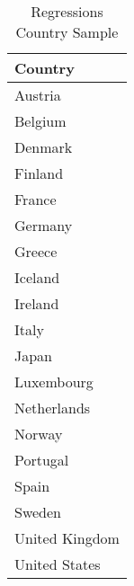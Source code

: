 \begin{table}[ht]
\centering
\caption{Regressions Country Sample} 
\label{country_sample}
{\footnotesize
\begin{tabular}{l}
  \hline
Country \\ 
  \hline
Austria \\ 
  Belgium \\ 
  Denmark \\ 
  Finland \\ 
  France \\ 
  Germany \\ 
  Greece \\ 
  Iceland \\ 
  Ireland \\ 
  Italy \\ 
  Japan \\ 
  Luxembourg \\ 
  Netherlands \\ 
  Norway \\ 
  Portugal \\ 
  Spain \\ 
  Sweden \\ 
  United Kingdom \\ 
  United States \\ 
   \hline
\end{tabular}
}
\end{table}
